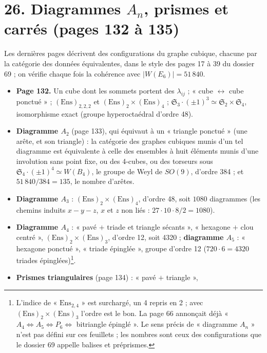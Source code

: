 \documentclass[11pt,a4paper]{article}
\begin{document}
\section*{26. Diagrammes $A_n$, prismes et carrés (pages 132 à 135)}

Les dernières pages décrivent des configurations du graphe cubique, chacune
par la catégorie des données équivalentes, dans le style des pages 17 à 39 du
dossier 69 ; on vérifie chaque fois la cohérence avec $|W(E_6)| = 51\,840$.

\begin{itemize}
\item \textbf{Page 132.} Un cube dont les sommets portent des $\lambda_{ij}$ ;
  « cube $\leftrightarrow$ cube ponctué » ; $(\mathrm{Ens})_{2,2,2}$ et
  $(\mathrm{Ens})_2 \times (\mathrm{Ens})_4$ ; $\mathfrak{S}_3 \cdot (\pm 1)^3
  \simeq \mathfrak{S}_2 \times \mathfrak{S}_4$, isomorphisme exact (groupe
  hyperoctaédral d'ordre 48).
\item \textbf{Diagramme $A_2$} (page 133), qui équivaut à un « triangle
  ponctué » (une arête, et son triangle) : la catégorie des graphes cubiques
  munis d'un tel diagramme est équivalente à celle des ensembles à huit éléments
  munis d'une involution sans point fixe, ou des 4-cubes, ou des torseurs sous
  $\mathfrak{S}_4 \cdot (\pm 1)^4 \simeq W(B_4)$, le groupe de Weyl de $SO(9)$,
  d'ordre 384 ; et $51\,840/384 = 135$, le nombre d'arêtes.
\item \textbf{Diagramme $A_3$} : $(\mathrm{Ens})_2 \times (\mathrm{Ens})_4$,
  d'ordre 48, soit $1080$ diagrammes (les chemins induits $x - y - z$, $x$ et $z$
  non liés : $27 \cdot 10 \cdot 8 / 2 = 1080$).
\item \textbf{Diagramme $A_4$} : « pavé $+$ triade et triangle sécants »,
  « hexagone $+$ clou centré », $(\mathrm{Ens})_2 \times (\mathrm{Ens})_3$, d'ordre
  12, soit 4320 ; \textbf{diagramme $A_5$} : « hexagone ponctué », « triade
  épinglée », groupe d'ordre 12 ($720 \cdot 6 = 4320$ triades
  épinglées)\footnote{L'indice de « $\mathrm{Ens}_{2,4}$ » est surchargé, un 4
  repris en 2 ; avec $(\mathrm{Ens})_2 \times (\mathrm{Ens})_3$ l'ordre est le
  bon. La page 66 annonçait déjà « $A_4 \Leftrightarrow A_5 \Leftrightarrow P_6
  \Leftrightarrow$ bitriangle épinglé ». Le sens précis de « diagramme $A_n$ »
  n'est pas défini sur ces feuillets ; les nombres sont ceux des configurations
  que le dossier 69 appelle balises et préprismes.}.
\item \textbf{Prismes triangulaires} (page 134) : « pavé $+$ triangle »,

\end{itemize}
\end{document}
